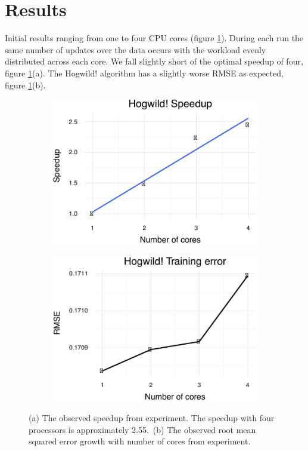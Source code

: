 \documentclass{article} %
\begin{document}
\section{Results}
Initial results ranging from one to four CPU cores (figure \ref{res}). During each run the same number of updates over the data occurs with the workload evenly distributed across each core. We fall slightly short of the optimal speedup of four, figure \ref{res}(a). The Hogwild! algorithm has a slightly worse RMSE as expected, figure \ref{res}(b).
\begin{figure}[H]
\centering
\begin{subfigure}{0.35\textwidth}
\includegraphics[width=\textwidth]{./speedup.pdf}
\end{subfigure}
\centering
\begin{subfigure}{0.35\textwidth}
\includegraphics[width=\textwidth]{./error.pdf}
\end{subfigure}
\caption{(a) The observed speedup from experiment. The speedup with four processors is approximately 2.55.~(b) The observed root mean squared error growth with number of cores from experiment.}
\label{res}
\end{figure}
\end{document}
